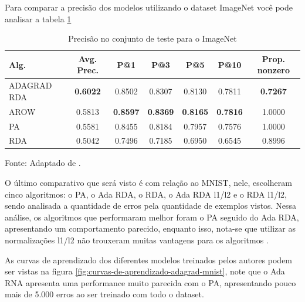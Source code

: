 Para comparar a precisão dos modelos utilizando o dataset ImageNet você pode analisar a tabela \ref{tab:resultados-imagenet-adagrad}

\begin{table}[htbp]
    \centering
    \begin{threeparttable} %
        \caption{Precisão no conjunto de teste para o ImageNet}
        \label{tab:resultados-imagenet-adagrad}
        \begin{tabular}{l c c c c c c}
            \toprule
            Alg. & Avg. Prec. & P@1 & P@3 & P@5 & P@10 & Prop. nonzero \\
            \midrule
            ADAGRAD RDA & \textbf{0.6022} & 0.8502 & 0.8307 & 0.8130 & 0.7811 & \textbf{0.7267} \\
            AROW & 0.5813 & \textbf{0.8597} & \textbf{0.8369} & \textbf{0.8165} & \textbf{0.7816} & 1.0000 \\
            PA & 0.5581 & 0.8455 & 0.8184 & 0.7957 & 0.7576 & 1.0000 \\
            RDA & 0.5042 & 0.7496 & 0.7185 & 0.6950 & 0.6545 & 0.8996 \\
            \bottomrule
        \end{tabular}
        
        \begin{tablenotes}[para] %
            \small %
            \item[] Fonte: Adaptado de \parencite{AdaGradMethod}.
        \end{tablenotes}

    \end{threeparttable} %
\end{table}

O último comparativo que será visto é com relação ao MNIST, nele, \textcite{AdaGradMethod} escolheram cinco algoritmos: o PA, o Ada RDA, o RDA, o Ada RDA l1/l2 e o RDA l1/l2, sendo analisada a quantidade de erros pela quantidade de exemplos vistos. Nessa análise, os algoritmos que performaram melhor foram o PA seguido do Ada RDA, apresentando um comportamento parecido, enquanto isso, nota-se que utilizar as normalizações l1/l2 não trouxeram muitas vantagens para os algoritmos \parencite{AdaGradMethod}.

As curvas de aprendizado dos diferentes modelos treinados pelos autores podem ser vistas na figura \ref{fig:curvas-de-aprendizado-adagrad-mnist}, note que o Ada RNA apresenta uma performance muito parecida com o PA, apresentando pouco mais de 5.000 erros ao ser treinado com todo o dataset.

